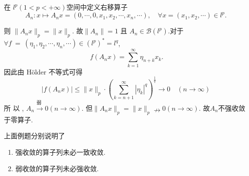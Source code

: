 \documentclass[lang=cn,18pt]{elegantbook}
\begin{document}
\begin{example}
    在 $l^p\left(1<p<+\infty\right)$空间中定义右移算子 
    $$A_n:x\mapsto A_nx= ( 0, \cdots , 0, x_1, x_2, \cdots , x_n, \cdots ),\quad \forall x= ( x_1, x_2, \cdots ) \in l^p.$$
    
则 $\| A_nx\| _p= \| x\| _p.$ 故$\|A_n\|=1$ 且 $A_n\in\mathscr{B}(l^p).$对于$\forall f\:=\:(\eta_{1},\eta_{2},\cdots,\eta_{n},\cdots)\in(l^{p})^{*}=l^{q}$,
$$\:f(A_{n}x)=\sum\limits_{k=1}^{\infty}\eta_{n+k}x_{k}.$$
因此由 Hölder 不等式可得
$$|f(A_n x)| \leqslant \|x\|_p \cdot \left(\sum\limits_{k=n+1}^{\infty}|\eta_k|^q \right
)^{\frac{1}{q}}\to 0 \quad (n \to \infty)$$
所 以 , $A_{n}\overset {\text{弱 }}{\operatorname* { \operatorname* { \longrightarrow } } } 0 \left ( n\to \infty \right ) .$ 但$\|A_nx\|_{p}=\|x\|_{p}\nrightarrow 0 \left(n\to\infty\right).$
故$A_n$不强收敛于零算子.
\end{example}
\begin{note}
    上面例题分别说明了
    \begin{enumerate}
        \item 强收敛的算子列未必一致收敛.
        \item 弱收敛的算子列未必强收敛.
    \end{enumerate}
\end{note}
\end{document}
